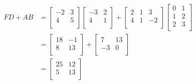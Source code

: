 \documentclass{article}
\begin{document}
\begin{align*}
    FD+AB &=
    \begin{bmatrix}
        -2 & 3\\
        4 & 5\\
    \end{bmatrix}
    \begin{bmatrix}
        -3 & 2\\
        4 & 1\\
    \end{bmatrix}
    +
    \begin{bmatrix}
        2 & 1 & 3\\
        4 & 1 & -2\\
    \end{bmatrix}
    \begin{bmatrix}
        0 & 1\\
        1 & 2\\
        2 & 3\\
    \end{bmatrix}\\
    &=
    \begin{bmatrix}
        18 & -1\\
        8 & 13\\
    \end{bmatrix}
    +
    \begin{bmatrix}
        7 & 13\\
        -3 & 0\\
    \end{bmatrix}\\
    &=
    \begin{bmatrix}
        25 & 12\\
        5 & 13\\
    \end{bmatrix}
\end{align*}
\end{document}
